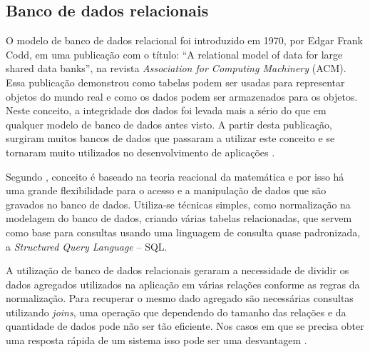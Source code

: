 \subsection{Banco de dados relacionais}

\par O modelo de banco de dados relacional foi introduzido em 1970, por Edgar Frank Codd, em uma publicação com o título: “A relational model of data for large shared data banks”, na revista \textit{Association for Computing Machinery} (ACM). Essa publicação demonstrou como tabelas podem ser usadas para representar objetos do mundo real e como os dados podem ser armazenados para os objetos. Neste conceito, a integridade dos dados foi levada mais a sério do que em qualquer modelo de banco de dados antes visto. A partir desta publicação, surgiram muitos bancos de dados que passaram a utilizar este conceito e se tornaram muito utilizados no desenvolvimento de aplicações
\cite{matthew_stones_beginning_databases_with_postgresql}.

\par Segundo , conceito é baseado na teoria reacional da matemática e por isso há uma grande flexibilidade para o acesso e a manipulação de dados que são gravados no banco de dados.  Utiliza-se técnicas simples, como normalização na modelagem do banco de dados, criando várias tabelas relacionadas, que servem como base para consultas usando uma linguagem de consulta quase padronizada, a \textit{Structured Query Language} – SQL\footnotemark[5].



\par A utilização de banco de dados relacionais geraram a necessidade de dividir os dados agregados utilizados na aplicação em várias relações conforme as regras da normalização. Para recuperar o mesmo dado agregado são necessárias consultas utilizando \textit{joins}, uma operação que dependendo do tamanho das relações e da quantidade de dados pode não ser tão eficiente. Nos casos em que se precisa obter uma resposta rápida de um sistema isso pode ser uma desvantagem \cite{sadalage_fowler_nosql_distilled_brief_guide}.

